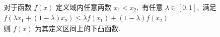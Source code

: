 \documentclass[preview]{standalone}
\begin{document}
\begin{align*}
& \text{对于函数 } f(x) \text{ 定义域内任意两数 } x_1 < x_2, \text{ 有任意 } \lambda \in [0, 1], \text{ 满足} \\ & f(\lambda x_1 + (1 - \lambda) x_2) \leq \lambda f(x_1) + (1 - \lambda) f(x_2) \\ & \text{则 } f(x) \text{ 为其定义区间上的下凸函数.}
\end{align*}
\end{document}
